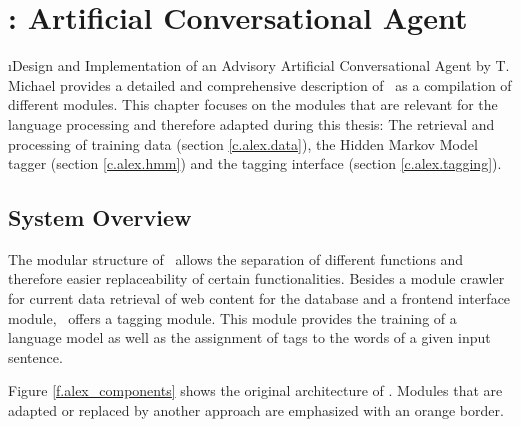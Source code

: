 \chapter{\Alex: Artificial Conversational Agent}\label{c.alex}
\i{Design and Implementation of an Advisory Artificial Conversational Agent} by T. Michael \cite{michael2016} provides a detailed and comprehensive description of \Alex\ as a compilation of different modules. This chapter focuses on the modules that are relevant for the language processing and therefore adapted during this thesis: The retrieval and processing of training data (section \ref{c.alex.data}), the Hidden Markov Model tagger (section \ref{c.alex.hmm}) and the tagging interface (section \ref{c.alex.tagging}).

\section{System Overview}\label{c.alex.overview}
The modular structure of \Alex\ allows the separation of different functions and therefore easier replaceability of certain functionalities. Besides a module crawler for current data retrieval of web content for the database and a frontend interface module, \Alex\ offers a tagging module. This module provides the training of a language model as well as the assignment of tags to the words of a given input sentence.

Figure \ref{f.alex_components} shows the original architecture of \Alex. Modules that are adapted or replaced by another approach are emphasized with an orange border.

